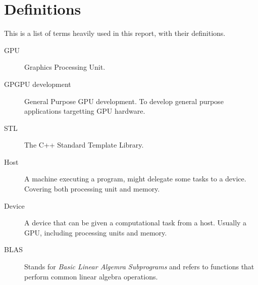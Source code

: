 \section*{Definitions}
This is a list of terms heavily used in this report, with their definitions.

\begin{description}
\item[GPU] Graphics Processing Unit.
\item[GPGPU development] General Purpose GPU development. To develop general purpose applications targetting GPU hardware.
\item[STL] The C++ Standard Template Library.
\item[Host] A machine executing a program, might delegate some tasks to a device. Covering both processing unit and memory.
\item[Device] A device that can be given a computational task from a host. Usually a GPU, including processing units and memory.
\item[BLAS] Stands for \textit{Basic Linear Algemra Subprograms} and refers to functions that perform common linear algebra operations.
\end{description}
